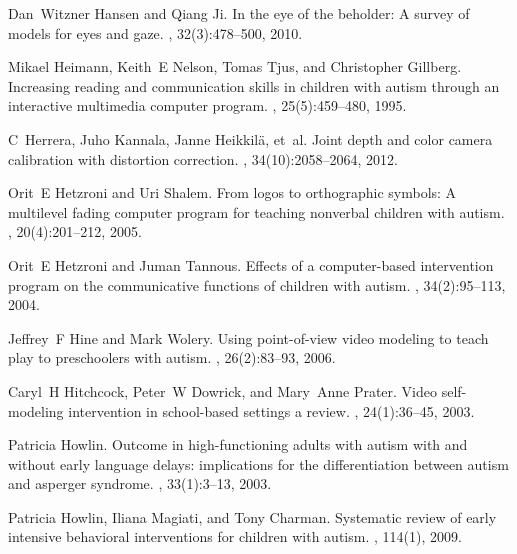\documentclass{ut-thesis}
\begin{document}
\begin{thebibliography}{100}
Dan~Witzner Hansen and Qiang Ji.
\newblock In the eye of the beholder: A survey of models for eyes and gaze.
, 32(3):478--500, 2010.

Mikael Heimann, Keith~E Nelson, Tomas Tjus, and Christopher Gillberg.
\newblock Increasing reading and communication skills in children with autism
  through an interactive multimedia computer program.
, 25(5):459--480,
  1995.

C~Herrera, Juho Kannala, Janne Heikkil{\"a}, et~al.
\newblock Joint depth and color camera calibration with distortion correction.
, 34(10):2058--2064, 2012.

Orit~E Hetzroni and Uri Shalem.
\newblock From logos to orthographic symbols: A multilevel fading computer
  program for teaching nonverbal children with autism.
,
  20(4):201--212, 2005.

Orit~E Hetzroni and Juman Tannous.
\newblock Effects of a computer-based intervention program on the communicative
  functions of children with autism.
, 34(2):95--113,
  2004.

Jeffrey~F Hine and Mark Wolery.
\newblock Using point-of-view video modeling to teach play to preschoolers with
  autism.
, 26(2):83--93,
  2006.

Caryl~H Hitchcock, Peter~W Dowrick, and Mary~Anne Prater.
\newblock Video self-modeling intervention in school-based settings a review.
, 24(1):36--45, 2003.

Patricia Howlin.
\newblock Outcome in high-functioning adults with autism with and without early
  language delays: implications for the differentiation between autism and
  asperger syndrome.
, 33(1):3--13,
  2003.

Patricia Howlin, Iliana Magiati, and Tony Charman.
\newblock Systematic review of early intensive behavioral interventions for
  children with autism.
, 114(1), 2009.


\end{thebibliography}
\end{document}
